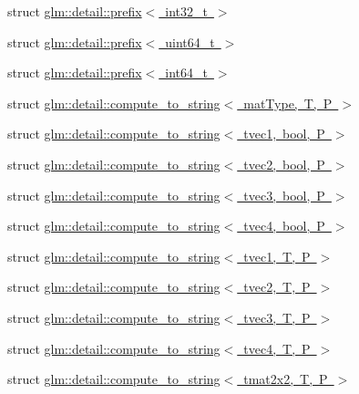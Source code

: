 \begin{DoxyCompactItemize}
\item 
struct \mbox{\hyperlink{structglm_1_1detail_1_1prefix_3_01int32__t_01_4}{glm\+::detail\+::prefix$<$ int32\+\_\+t $>$}}
\item 
struct \mbox{\hyperlink{structglm_1_1detail_1_1prefix_3_01uint64__t_01_4}{glm\+::detail\+::prefix$<$ uint64\+\_\+t $>$}}
\item 
struct \mbox{\hyperlink{structglm_1_1detail_1_1prefix_3_01int64__t_01_4}{glm\+::detail\+::prefix$<$ int64\+\_\+t $>$}}
\item 
struct \mbox{\hyperlink{structglm_1_1detail_1_1compute__to__string}{glm\+::detail\+::compute\+\_\+to\+\_\+string$<$ mat\+Type, T, P $>$}}
\item 
struct \mbox{\hyperlink{structglm_1_1detail_1_1compute__to__string_3_01tvec1_00_01bool_00_01_p_01_4}{glm\+::detail\+::compute\+\_\+to\+\_\+string$<$ tvec1, bool, P $>$}}
\item 
struct \mbox{\hyperlink{structglm_1_1detail_1_1compute__to__string_3_01tvec2_00_01bool_00_01_p_01_4}{glm\+::detail\+::compute\+\_\+to\+\_\+string$<$ tvec2, bool, P $>$}}
\item 
struct \mbox{\hyperlink{structglm_1_1detail_1_1compute__to__string_3_01tvec3_00_01bool_00_01_p_01_4}{glm\+::detail\+::compute\+\_\+to\+\_\+string$<$ tvec3, bool, P $>$}}
\item 
struct \mbox{\hyperlink{structglm_1_1detail_1_1compute__to__string_3_01tvec4_00_01bool_00_01_p_01_4}{glm\+::detail\+::compute\+\_\+to\+\_\+string$<$ tvec4, bool, P $>$}}
\item 
struct \mbox{\hyperlink{structglm_1_1detail_1_1compute__to__string_3_01tvec1_00_01_t_00_01_p_01_4}{glm\+::detail\+::compute\+\_\+to\+\_\+string$<$ tvec1, T, P $>$}}
\item 
struct \mbox{\hyperlink{structglm_1_1detail_1_1compute__to__string_3_01tvec2_00_01_t_00_01_p_01_4}{glm\+::detail\+::compute\+\_\+to\+\_\+string$<$ tvec2, T, P $>$}}
\item 
struct \mbox{\hyperlink{structglm_1_1detail_1_1compute__to__string_3_01tvec3_00_01_t_00_01_p_01_4}{glm\+::detail\+::compute\+\_\+to\+\_\+string$<$ tvec3, T, P $>$}}
\item 
struct \mbox{\hyperlink{structglm_1_1detail_1_1compute__to__string_3_01tvec4_00_01_t_00_01_p_01_4}{glm\+::detail\+::compute\+\_\+to\+\_\+string$<$ tvec4, T, P $>$}}
\item 
struct \mbox{\hyperlink{structglm_1_1detail_1_1compute__to__string_3_01tmat2x2_00_01_t_00_01_p_01_4}{glm\+::detail\+::compute\+\_\+to\+\_\+string$<$ tmat2x2, T, P $>$}}

\end{DoxyCompactItemize}
